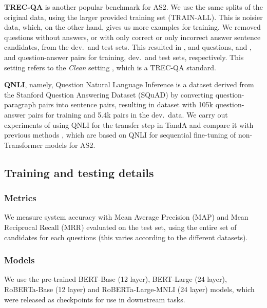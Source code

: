 \documentclass[letterpaper]{article} \usepackage{aaai20}  \usepackage{times}  \usepackage{helvet} \usepackage{courier}  \usepackage[hyphens]{url}  \usepackage{graphicx} \urlstyle{rm} \def\UrlFont{\rm}  \usepackage{graphicx}  \usepackage{todonotes}
\newcommand{\ASS}{AS2}
\newcommand{\TANDA}{T{\sc and}A}
\begin{document}
\noindent \textbf{TREC-QA} is another popular benchmark \cite{wang-etal-2007-jeopardy} for {\ASS}. We use the same splits of the original data, using the larger provided training set (TRAIN-ALL). This is noisier data, which, on the other hand, gives us more examples for training. We removed  questions without answers, or with only correct or only incorrect answer sentence candidates, from the dev.~and test sets. This resulted in ,  and  questions, and ,  and  question-answer pairs for training, dev.~and test sets, respectively. This setting refers to the \emph{Clean} setting \cite{shen-etal-2017-inter}, which is a TREC-QA standard. 

\noindent \textbf{QNLI}, namely, Question Natural Language Inference
is a dataset \cite{DBLP:journals/corr/abs-1804-07461} derived from the Stanford Question Answering Dataset (SQuAD) \cite{DBLP:journals/corr/RajpurkarZLL16} by converting question-paragraph pairs into sentence pairs, resulting in dataset with 105k question-answer pairs for training and 5.4k pairs in the dev.~data.
We carry out experiments  of using QNLI for the transfer step in {\TANDA} and compare it with previous methods \cite{DBLP:journals/corr/abs-1905-12897}, which are based on QNLI for sequential fine-tuning of non-Transformer models for AS2.  

\subsection{Training and testing details}
\subsubsection{Metrics} We measure system accuracy with Mean Average Precision (MAP) and Mean Reciprocal Recall (MRR) evaluated on the test set, using the entire set of candidates for each questions (this varies according to the different datasets). 

\subsubsection{Models} We use the pre-trained BERT-Base (12 layer), BERT-Large (24 layer), RoBERTa-Base (12 layer) and RoBERTa-Large-MNLI (24 layer) models, which were released as checkpoints for use in downstream tasks. 
\end{document}
